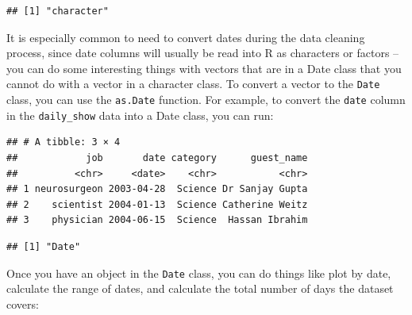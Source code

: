 \documentclass[]{book}
\makeatletter
\newenvironment{Shaded}{\begin{snugshade}}{\end{snugshade}}
\newcommand{\KeywordTok}[1]{\textcolor[rgb]{0.13,0.29,0.53}{\textbf{{#1}}}}
\newcommand{\DataTypeTok}[1]{\textcolor[rgb]{0.13,0.29,0.53}{{#1}}}
\newcommand{\DecValTok}[1]{\textcolor[rgb]{0.00,0.00,0.81}{{#1}}}
\newcommand{\StringTok}[1]{\textcolor[rgb]{0.31,0.60,0.02}{{#1}}}
\newcommand{\NormalTok}[1]{{#1}}
\newenvironment{kframe}{%
\medskip{}
\setlength{\fboxsep}{.8em}
 \def\at@end@of@kframe{}%
 \ifinner\ifhmode%
  \def\at@end@of@kframe{\end{minipage}}%
  \begin{minipage}{\columnwidth}%
 \fi\fi%
 \def\FrameCommand##1{\hskip\@totalleftmargin \hskip-\fboxsep
 \colorbox{shadecolor}{##1}\hskip-\fboxsep
     \hskip-\linewidth \hskip-\@totalleftmargin \hskip\columnwidth}%
 \MakeFramed {\advance\hsize-\width
   \@totalleftmargin\z@ \linewidth\hsize
   \@setminipage}}%
 {\par\unskip\endMakeFramed%
 \at@end@of@kframe}
\renewenvironment{Shaded}{\begin{kframe}}{\end{kframe}}
\makeatother
\begin{document}
\begin{verbatim}
## [1] "character"
\end{verbatim}

It is especially common to need to convert dates during the data
cleaning process, since date columns will usually be read into R as
characters or factors -- you can do some interesting things with vectors
that are in a Date class that you cannot do with a vector in a character
class. To convert a vector to the \texttt{Date} class, you can use the
\texttt{as.Date} function. For example, to convert the \texttt{date}
column in the \texttt{daily\_show} data into a Date class, you can run:

\begin{Shaded}
\end{Shaded}

\begin{verbatim}
## # A tibble: 3 × 4
##            job       date category      guest_name
##          <chr>     <date>    <chr>           <chr>
## 1 neurosurgeon 2003-04-28  Science Dr Sanjay Gupta
## 2    scientist 2004-01-13  Science Catherine Weitz
## 3    physician 2004-06-15  Science  Hassan Ibrahim
\end{verbatim}

\begin{Shaded}
\end{Shaded}

\begin{verbatim}
## [1] "Date"
\end{verbatim}

Once you have an object in the \texttt{Date} class, you can do things
like plot by date, calculate the range of dates, and calculate the total
number of days the dataset covers:

\begin{Shaded}
\end{Shaded}
\end{document}
